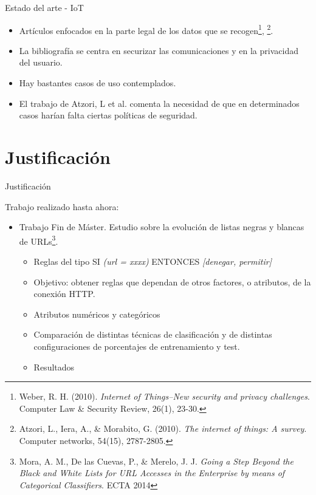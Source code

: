 \documentclass{beamer}
\begin{document}
\begin{frame}{Estado del arte - IoT}

\begin{itemize}
  \item<1-> Artículos enfocados en la parte legal de los datos que se recogen\footnote{Weber, R. H. (2010). \textit{Internet of Things–New security and privacy challenges}. Computer Law \& Security Review, 26(1), 23-30.}, \footnote{Atzori, L., Iera, A., \& Morabito, G. (2010). \textit{The internet of things: A survey}. Computer networks, 54(15), 2787-2805.}.
  \item<2-> La bibliografía se centra en securizar las comunicaciones y en la privacidad del usuario.
  \item<3-> Hay bastantes casos de uso contemplados.
  \item<4-> El trabajo de Atzori, L et al. comenta la necesidad de que en determinados casos harían falta ciertas políticas de seguridad.
\end{itemize}

\end{frame}

\section{Justificación}

\begin{frame}{Justificación}

Trabajo realizado hasta ahora:

\begin{itemize}
  \item<1-> Trabajo Fin de Máster. Estudio sobre la evolución de listas negras y blancas de URLs\footnote{Mora, A. M., De las Cuevas, P., \& Merelo, J. J. \textit{Going a Step Beyond the Black and White Lists for URL Accesses in the Enterprise by means of Categorical Classifiers}. ECTA 2014}.
  \begin{itemize}
    \item<2-> Reglas del tipo SI \textit{(url = xxxx)} ENTONCES \textit{[denegar, permitir]}
    \item<3-> Objetivo: obtener reglas que dependan de otros factores, o atributos, de la conexión HTTP.
    \item<4-> Atributos numéricos y categóricos
    \item<5-> Comparación de distintas técnicas de clasificación y de distintas configuraciones de porcentajes de entrenamiento y test.
    \item<6-> Resultados
  \end{itemize}
\end{itemize}

\end{frame}
\end{document}
